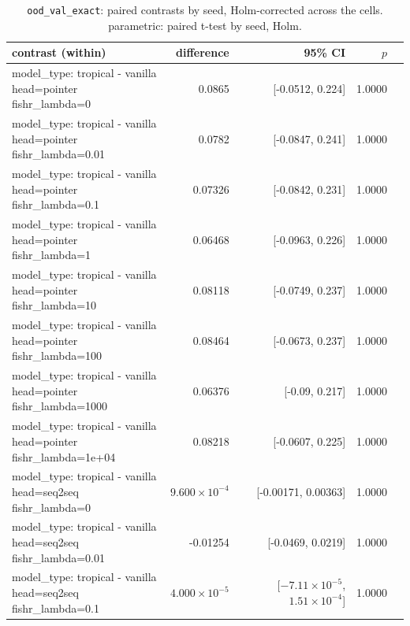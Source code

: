 \documentclass[10pt]{article}
\makeatletter
\newcommand{\stackcell}[1]{\begin{tabular}[t]{@{}l@{}}#1\end{tabular}}
\makeatother
\begin{document}
{\small
\begin{longtable}{lrrrl}
\caption{\texttt{ood\_val\_exact}: paired contrasts by seed, Holm-corrected across the cells. parametric: paired t-test by seed, Holm.}\label{tab:paired-ood_val_exact}\\
\toprule
contrast (within) & difference & 95\% CI & $p$ & \\
\midrule
\endhead
\stackcell{model\_type: tropical - vanilla\\\footnotesize head=pointer fishr\_lambda=0 } & 0.0865 & [-0.0512, 0.224] & 1.0000 & \\
\stackcell{model\_type: tropical - vanilla\\\footnotesize head=pointer fishr\_lambda=0.01 } & 0.0782 & [-0.0847, 0.241] & 1.0000 & \\
\stackcell{model\_type: tropical - vanilla\\\footnotesize head=pointer fishr\_lambda=0.1 } & 0.07326 & [-0.0842, 0.231] & 1.0000 & \\
\stackcell{model\_type: tropical - vanilla\\\footnotesize head=pointer fishr\_lambda=1 } & 0.06468 & [-0.0963, 0.226] & 1.0000 & \\
\stackcell{model\_type: tropical - vanilla\\\footnotesize head=pointer fishr\_lambda=10 } & 0.08118 & [-0.0749, 0.237] & 1.0000 & \\
\stackcell{model\_type: tropical - vanilla\\\footnotesize head=pointer fishr\_lambda=100 } & 0.08464 & [-0.0673, 0.237] & 1.0000 & \\
\stackcell{model\_type: tropical - vanilla\\\footnotesize head=pointer fishr\_lambda=1000 } & 0.06376 & [-0.09, 0.217] & 1.0000 & \\
\stackcell{model\_type: tropical - vanilla\\\footnotesize head=pointer fishr\_lambda=1e+04 } & 0.08218 & [-0.0607, 0.225] & 1.0000 & \\
\stackcell{model\_type: tropical - vanilla\\\footnotesize head=seq2seq fishr\_lambda=0 } & $9.600\times10^{-4}$ & [-0.00171, 0.00363] & 1.0000 & \\
\stackcell{model\_type: tropical - vanilla\\\footnotesize head=seq2seq fishr\_lambda=0.01 } & -0.01254 & [-0.0469, 0.0219] & 1.0000 & \\
\stackcell{model\_type: tropical - vanilla\\\footnotesize head=seq2seq fishr\_lambda=0.1 } & $4.000\times10^{-5}$ & [$-7.11\times10^{-5}$, $1.51\times10^{-4}$] & 1.0000 & \\

\end{longtable}}
\end{document}
